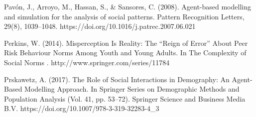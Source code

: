 \documentclass{article}
\begin{document}
Pavón, J., Arroyo, M., Hassan, S., & Sansores, C. (2008). Agent-based modelling and simulation for the analysis of social patterns. Pattern Recognition Letters, 29(8), 1039–1048. https://doi.org/10.1016/j.patrec.2007.06.021

Perkins, W. (2014). Misperception Is Reality: The “Reign of Error” About Peer Risk Behaviour Norms Among Youth and Young Adults. In The Complexity of Social Norms                                                              . http://www.springer.com/series/11784

Prskawetz, A. (2017). The Role of Social Interactions in Demography: An Agent-Based Modelling Approach. In Springer Series on Demographic Methods and Population Analysis (Vol. 41, pp. 53–72). Springer Science and Business Media B.V. https://doi.org/10.1007/978-3-319-32283-4_3
 
\end{document}
